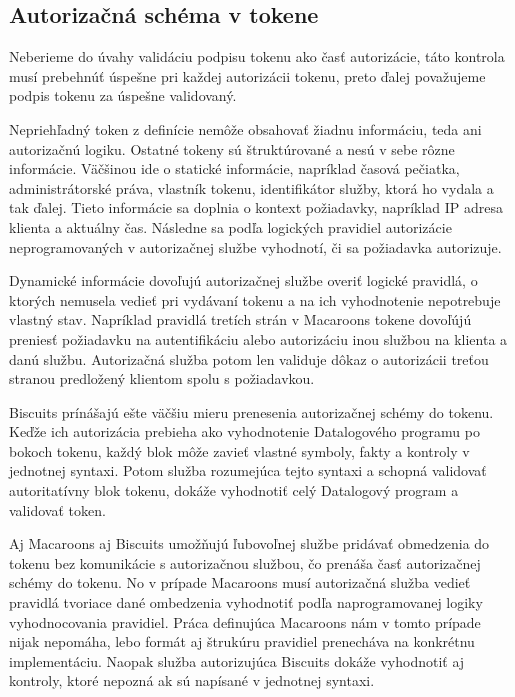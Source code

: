 \subsection{Autorizačná schéma v tokene}

Neberieme do úvahy validáciu podpisu tokenu ako časť autorizácie, táto kontrola musí prebehnúť úspešne pri každej autorizácii tokenu, preto ďalej považujeme podpis tokenu za úspešne validovaný.

Nepriehľadný token z definície nemôže obsahovať žiadnu informáciu, teda ani autorizačnú logiku. Ostatné tokeny sú štruktúrované a nesú v sebe rôzne informácie. Väčšinou ide o statické informácie, napríklad časová pečiatka, administrátorské práva, vlastník tokenu, identifikátor služby, ktorá ho vydala a tak ďalej. Tieto informácie sa doplnia o kontext požiadavky, napríklad IP adresa klienta a aktuálny čas. Následne sa podľa logických pravidiel autorizácie neprogramovaných v autorizačnej službe vyhodnotí, či sa požiadavka autorizuje.

Dynamické informácie dovoľujú autorizačnej službe overiť logické pravidlá, o ktorých nemusela vedieť pri vydávaní tokenu a na ich vyhodnotenie nepotrebuje vlastný stav. Napríklad pravidlá tretích strán v Macaroons tokene dovoľújú preniesť požiadavku na autentifikáciu alebo autorizáciu inou službou na klienta a danú službu. Autorizačná služba potom len validuje dôkaz o autorizácii treťou stranou predložený klientom spolu s požiadavkou.

Biscuits prínášajú ešte väčšiu mieru prenesenia autorizačnej schémy do tokenu. Keďže ich autorizácia prebieha ako vyhodnotenie Datalogového programu po bokoch tokenu, každý blok môže zavieť vlastné symboly, fakty a kontroly v jednotnej syntaxi. Potom služba rozumejúca tejto syntaxi a schopná validovať autoritatívny blok tokenu, dokáže vyhodnotiť celý Datalogový program a validovať token.

Aj Macaroons aj Biscuits umožňujú ľubovoľnej službe pridávať obmedzenia do tokenu bez komunikácie s autorizačnou službou, čo prenáša časť autorizačnej schémy do tokenu. No v prípade Macaroons musí autorizačná služba vedieť pravidlá tvoriace dané ombedzenia vyhodnotiť podľa naprogramovanej logiky vyhodnocovania pravidiel. Práca definujúca Macaroons \cite{macaroons_paper} nám v tomto prípade nijak nepomáha, lebo formát aj štrukúru pravidiel prenecháva na konkrétnu implementáciu. Naopak služba autorizujúca Biscuits dokáže vyhodnotiť aj kontroly, ktoré nepozná ak sú napísané v jednotnej syntaxi.


